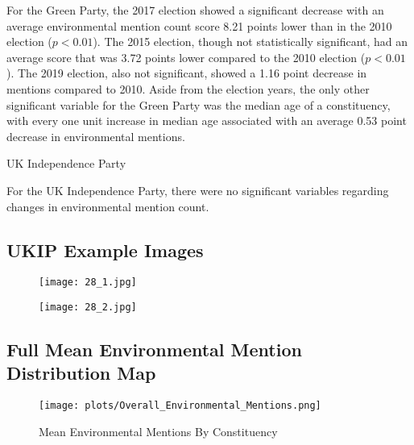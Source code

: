 \documentclass[12pt,letterpaper]{article}
\begin{document}
For the Green Party, the 2017 election showed a significant decrease with an average environmental mention count score 8.21 points lower than in the 2010 election ($p<0.01$). The 2015 election, though not statistically significant, had an average score that was 3.72 points lower compared to the 2010 election ($p<0.01$). The 2019 election, also not significant, showed a 1.16 point decrease in mentions compared to 2010. Aside from the election years, the only other significant variable for the Green Party was the median age of a constituency, with every one unit increase in median age associated with an average 0.53 point decrease in environmental mentions.

UK Independence Party

For the UK Independence Party, there were no significant variables regarding changes in environmental mention count.


\subsection{UKIP Example Images}


\begin{figure}[H]
	\centering
	\texttt{[image: 28\_1.jpg]}
	\caption{}
	\label{fig:28_1}
\end{figure}

\begin{figure}[H]
	\centering
	\texttt{[image: 28\_2.jpg]}
	\caption{}
	\label{fig:28_2}
\end{figure}





\subsection{Full Mean Environmental Mention Distribution Map}

\begin{figure}[H]
	\centering
	\texttt{[image: plots/Overall\_Environmental\_Mentions.png]}
	\caption{Mean Environmental Mentions By Constituency}
	\label{fig:meanenvbyconold}
\end{figure}







\newpage
	
\printbibliography
	
\end{document}
